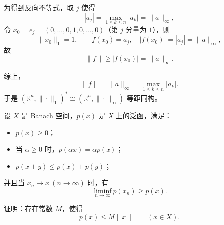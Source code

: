 \begin{solution}
为得到反向不等式，取 $j$ 使得
\[
|a_j|=\max_{1\le k\le n}|a_k|=\|a\|_\infty,
\]
令 $x_0=e_j=(0,\dots,0,1,0,\dots,0)$（第 $j$ 分量为 $1$），则
\[
\|x_0\|_1=1,\qquad f(x_0)=a_j,\quad |f(x_0)|=|a_j|=\|a\|_\infty,
\]
故
\[
\|f\|\ge |f(x_0)|=\|a\|_\infty.
\]

综上，
\[
\|f\|=\|a\|_\infty=\max_{1\le k\le n}|a_k|.
\]
于是 $(\mathbb{R}^n,\|\cdot\|_1)^* \cong (\mathbb{R}^n,\|\cdot\|_\infty)$ 等距同构。

\end{solution}
\begin{homework}[题目 7]

设 $X$ 是 Banach 空间，$p(x)$ 是 $X$ 上的泛函，满足：

\begin{itemize}
  \item[(1)] $p(x)\ge 0$；
  \item[(2)] 当 $\alpha\ge 0$ 时，$p(\alpha x)=\alpha p(x)$；
  \item[(3)] $p(x+y)\le p(x)+p(y)$；
\end{itemize}

并且当 $x_n\to x\ (n\to\infty)$ 时，有
\[
\liminf_{n\to\infty} p(x_n)\ge p(x).
\]

证明：存在常数 $M$，使得
\[
p(x)\le M\|x\|\qquad (x\in X).
\]

\end{homework}

